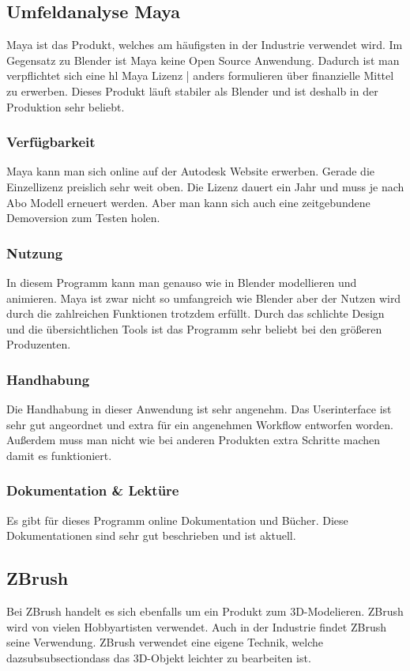 \subsection{Umfeldanalyse Maya}
Maya ist das Produkt, welches am häufigsten in der Industrie verwendet wird. Im Gegensatz zu Blender ist Maya keine Open Source Anwendung. Dadurch ist man verpflichtet sich eine hl  {Maya Lizenz | anders formulieren} über finanzielle Mittel zu erwerben. Dieses Produkt läuft stabiler als Blender und ist deshalb in der Produktion sehr beliebt.


\subsubsection{Verfügbarkeit}
Maya kann man sich online auf der Autodesk Website erwerben. Gerade die Einzellizenz preislich sehr weit oben. Die Lizenz dauert ein Jahr und muss je nach Abo Modell erneuert werden. Aber man kann sich auch eine zeitgebundene Demoversion zum Testen holen.

\subsubsection{Nutzung}
In diesem Programm kann man genauso wie in Blender modellieren und animieren. Maya ist zwar nicht so umfangreich wie Blender aber der Nutzen wird durch die zahlreichen Funktionen trotzdem erfüllt. Durch das schlichte Design und die übersichtlichen Tools ist das Programm sehr beliebt bei den größeren Produzenten.

\subsubsection{Handhabung}
Die Handhabung in dieser Anwendung ist sehr angenehm. Das Userinterface ist sehr gut angeordnet und extra für ein angenehmen Workflow entworfen worden. Außerdem muss man nicht wie bei anderen Produkten extra Schritte machen damit es funktioniert.

\subsubsection{Dokumentation \& Lektüre}
Es gibt für dieses Programm online Dokumentation und Bücher. Diese Dokumentationen sind sehr gut beschrieben und ist aktuell.

\pagebreak

\subsection{ZBrush}
Bei ZBrush handelt es sich ebenfalls um ein Produkt zum 3D-Modelieren. ZBrush wird von vielen Hobbyartisten verwendet. Auch in der Industrie findet ZBrush seine Verwendung. ZBrush verwendet eine eigene Technik, welche dazsubsubsectiondass das 3D-Objekt leichter zu bearbeiten ist.


